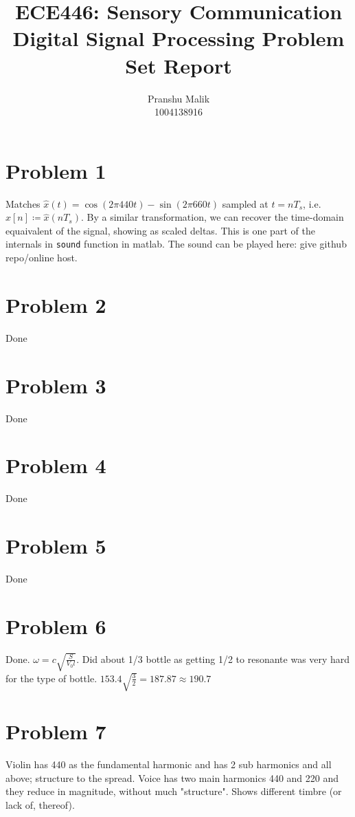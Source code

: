 \documentclass[10pt]{article}
\date{}
\begin{document}
\title{\textbf{\Large{\textsc{ECE446:} Sensory Communication}} \\ \Large{Digital Signal Processing Problem Set Report}\vspace{-0.3cm}}
\author{Pranshu Malik\\ \footnotesize{1004138916}\vspace{-3cm}}

\maketitle

\section{Problem 1}
Matches $\hat{x}(t) = \cos(2\pi440t) - \sin(2\pi660t)$ sampled at $t = nT_s$, i.e. $\hat{x}[n] \coloneqq \hat{x}(nT_s)$. By a similar transformation, we can recover the time-domain equaivalent of the signal, showing as scaled deltas. This is one part of the internals in \texttt{sound} function in matlab. The sound can be played here: give github repo/online host.

\section{Problem 2}
Done

\section{Problem 3}
Done
\section{Problem 4}
Done
\section{Problem 5}
Done
\section{Problem 6}
Done. $\omega = c\sqrt{\frac{S}{V_0l}}$. Did about 1/3 bottle as getting 1/2 to resonante was very hard for the type of bottle. $153.4\sqrt{\frac{3}{2}} = 187.87 \approx 190.7$
\section{Problem 7}
Violin has 440 as the fundamental harmonic and has 2 sub harmonics and all above; structure to the spread. Voice has two main harmonics 440 and 220 and they reduce in magnitude, without much "structure". Shows different timbre (or lack of, thereof).
\end{document}
